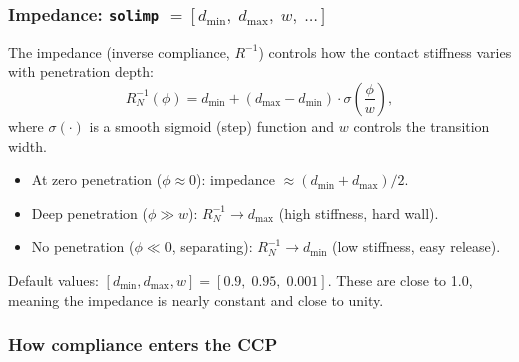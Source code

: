 \documentclass[11pt,twoside]{report}
\theoremstyle{definition}
\theoremstyle{plain}
\theoremstyle{remark}
\newcommand{\0}{\bm{0}}
\begin{document}
\subsubsection{Impedance: \texttt{solimp} $=[d_{\min},\;d_{\max},\;w,\;\ldots]$}

The impedance (inverse compliance, $R^{-1}$) controls how the contact
stiffness varies with penetration depth:
\begin{equation}\label{eq:solimp-math}
R_{N}^{-1}(\phi)=d_{\min}+(d_{\max}-d_{\min})\cdot\sigma\!\left(\frac{\phi}{w}\right),
\end{equation}
where $\sigma(\cdot)$ is a smooth sigmoid (step) function and $w$ controls the
transition width.

\begin{itemize}
\item At zero penetration ($\phi\approx 0$): impedance $\approx(d_{\min}+d_{\max})/2$.
\item Deep penetration ($\phi\gg w$): $R_{N}^{-1}\to d_{\max}$ (high stiffness, hard wall).
\item No penetration ($\phi\ll 0$, separating): $R_{N}^{-1}\to d_{\min}$ (low stiffness, easy release).
\end{itemize}

Default values: $[d_{\min},d_{\max},w]=[0.9,\;0.95,\;0.001]$.
These are close to 1.0, meaning the impedance is nearly constant and close to unity.

\begin{center}
\end{center}

\subsubsection{How compliance enters the CCP}
\end{document}
